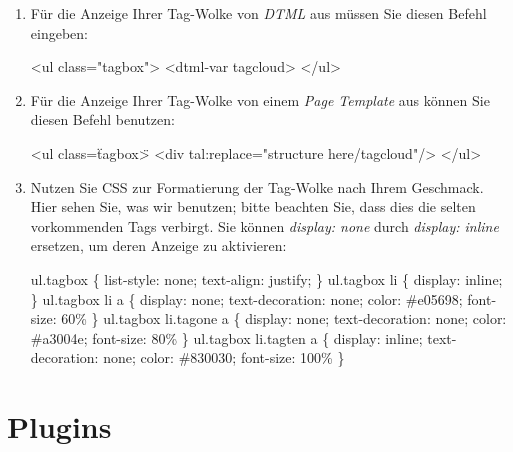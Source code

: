 \begin{enumerate}
    \item Für die Anzeige Ihrer Tag-Wolke von \textit{DTML} aus müssen Sie diesen Befehl eingeben: 

    <ul class="tagbox">\newline
        <dtml-var tagcloud>\newline
    </ul> \newline

    \item Für die Anzeige Ihrer Tag-Wolke von einem \textit{Page Template} aus können Sie diesen Befehl benutzen: 

    <ul class=\"tagbox\">\newline
        <div tal:replace="structure here/tagcloud"/>\newline
    </ul>\newline

    \item Nutzen Sie CSS zur Formatierung der Tag-Wolke nach Ihrem Geschmack. Hier sehen Sie, was wir benutzen; bitte beachten Sie, dass dies die selten vorkommenden Tags verbirgt. Sie können \textit{display: none} durch \textit{display: inline} ersetzen, um deren Anzeige zu aktivieren: 

    ul.tagbox \{ list-style: none; text-align: justify; \}\newline
    ul.tagbox li \{ display: inline; \}\newline
    ul.tagbox li a \{ display: none; text-decoration: none; color: \#e05698; font-size: 60\% \} \newline
    ul.tagbox li.tagone a \{  display: none; text-decoration: none; color: \#a3004e; font-size: 80\% \} \newline
    ul.tagbox li.tagten a \{  display: inline; text-decoration: none; color: \#830030; font-size: 100\% \} \newline
\end{enumerate}

\section{Plugins} 
\label{sec:plugins}
